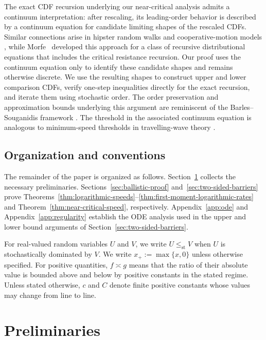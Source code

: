 \documentclass[12pt,preprint]{amsart}
\numberwithin{equation}{section}
\theoremstyle{plain}
\theoremstyle{definition}
\newcommand{\stle}{\le_{\mathrm{st}}}
\begin{document}
The exact CDF recursion underlying our near-critical analysis admits a
continuum interpretation: after rescaling, its leading-order behavior is
described by a continuum equation for candidate limiting shapes of the
rescaled CDFs.  Similar connections arise in hipster random walks and
cooperative-motion models
\cite{AddarioBerryEtAl2020,AddarioBerryBeckmanLin2022,
AddarioBerryBeckmanLin2024}, while Morfe~\cite{Morfe2026} developed this
approach for a class of recursive distributional equations that includes the
critical resistance recursion.  Our proof uses
the continuum equation
only to identify these candidate shapes and remains otherwise discrete.  We
use the resulting shapes to construct upper and lower comparison CDFs, verify
one-step inequalities directly for the exact recursion, and iterate them
using stochastic order.  The order preservation and approximation bounds
underlying this argument are reminiscent of the Barles--Souganidis framework
\cite{BarlesSouganidis1991}.  The threshold in the associated continuum
equation is analogous to minimum-speed thresholds in travelling-wave theory
\cite{HadelerRothe1975,SanchezGardunoMaini1994}.

\subsection{Organization and conventions}
\label{sec:organization-conventions}

The remainder of the paper is organized as follows.
Section~\ref{sec:preliminaries} collects the necessary preliminaries.
Sections~\ref{sec:ballistic-proof}
and~\ref{sec:two-sided-barriers} prove
Theorems~\ref{thm:logarithmic-speeds}--\ref{thm:first-moment-logarithmic-rates}
and Theorem~\ref{thm:near-critical-speed}, respectively.
Appendix~\ref{app:ode} and Appendix~\ref{app:regularity} establish the
ODE analysis used in the upper and lower bound arguments of Section~\ref{sec:two-sided-barriers}.

For real-valued random variables $U$ and $V$, we write
$U\stle V$ when $U$ is stochastically dominated by $V$.  We write
$x_+:=\max\{x,0\}$ unless otherwise specified.   For positive quantities, $f\asymp g$
means that the ratio of their absolute value is bounded above and below by positive constants in
the stated regime.  Unless stated otherwise, $c$ and $C$ denote finite
positive constants whose values may change from line to line.

%
%
%
%
%
%
%
%
%
%
%
%
%
%
%
%
%
%
%
%
%
%
%
%
%
%
%
%
%
%
%
%
%
%
%
%
%
\section{Preliminaries}
\label{sec:preliminaries}
\end{document}
